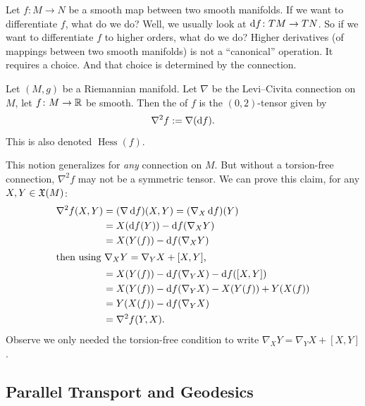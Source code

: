 
\lecture{}

\begin{node}
Let $f\colon M\to N$ be a smooth map between two smooth manifolds. 
If we want to differentiate $f$, what do we do? Well, we usually look
at $\mathrm{d} f\colon TM\to TN$. So if we want to differentiate $f$ to higher
orders, what do we do? Higher derivatives (of mappings between two
smooth manifolds) is not a ``canonical'' operation. It requires a
choice. And that choice is determined by the connection.
\end{node}

\begin{definition}
Let $(M,g)$ be a Riemannian manifold. Let $\nabla$ be the Levi--Civita
connection on $M$, let $f\colon M\to\mathbb{R}$ be smooth. Then the
 of $f$ is the $(0,2)$-tensor given by
\begin{equation*}
\nabla^{2}f := \nabla(\mathrm{d} f).
\end{equation*}
This is also denoted $\operatorname{Hess}(f)$.
\end{definition}

\begin{remark}
This notion generalizes for \emph{any} connection on $M$. But without
a torsion-free connection, $\nabla^{2}f$ may not be a symmetric tensor.
We can prove this claim, for any $X,Y\in\mathfrak{X}(M)$:
\begin{subequations}
  \begin{align}
\nabla^{2}f(X,Y)
&=(\nabla\,\mathrm{d} f)(X,Y) = (\nabla_{X}\,\mathrm{d} f)(Y)\\
&=X(\mathrm{d} f(Y))-\mathrm{d} f(\nabla_{X}Y)\\
&=X(Y(f))-\mathrm{d} f(\nabla_{X}Y)\\
\intertext{then using $\nabla_{X}Y=\nabla_{Y}X+[X,Y]$,}
&=X(Y(f))-\mathrm{d} f(\nabla_{Y}X)-\mathrm{d} f([X,Y])\\
&=X(Y(f))-\mathrm{d} f(\nabla_{Y}X)-X(Y(f))+Y(X(f))\\
&=Y(X(f))-\mathrm{d} f(\nabla_{Y}X)\\
&=\nabla^{2}f(Y,X).
  \end{align}
\end{subequations}
Observe we only needed the torsion-free condition to write $\nabla_{X}Y=\nabla_{Y}X+[X,Y]$.
\end{remark}

\subsection{Parallel Transport and Geodesics}

